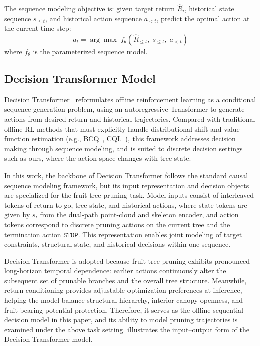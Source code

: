 \documentclass[12pt,a4paper,fontset=fandol]{ctexart}
\begin{document}
The sequence modeling objective is:
given target return $\hat{R}_t$, historical state sequence $s_{\leq t}$, and historical action sequence $a_{<t}$,
predict the optimal action at the current time step:
\begin{equation}\label{eq:seq_model}
  \hat{a}_t = \arg\max\; f_\theta\!\left(\hat{R}_{\leq t},\; s_{\leq t},\; a_{<t}\right)
\end{equation}
where $f_\theta$ is the parameterized sequence model.


\subsection{Decision Transformer Model}\label{sec:model:dt}

Decision Transformer~\citep{chen2021decision} reformulates offline reinforcement learning
as a conditional sequence generation problem,
using an autoregressive Transformer to generate actions from desired return and historical trajectories.
Compared with traditional offline RL methods that must explicitly handle distributional shift and value-function estimation (e.g.,
BCQ~\citep{fujimoto2019bcq}, CQL~\citep{kumar2020conservative}),
this framework addresses decision making through sequence modeling,
and is suited to discrete decision settings such as ours, where the action space changes with tree state.

In this work, the backbone of Decision Transformer follows the standard causal sequence modeling framework,
but its input representation and decision objects are specialized for the fruit-tree pruning task.
Model inputs consist of interleaved tokens of return-to-go, tree state, and historical actions,
where state tokens are given by $s_t$ from the dual-path point-cloud and skeleton encoder,
and action tokens correspond to discrete pruning actions on the current tree and the termination action $\texttt{STOP}$.
This representation enables joint modeling of target constraints, structural state, and historical decisions within one sequence.

Decision Transformer is adopted because fruit-tree pruning exhibits pronounced long-horizon temporal dependence:
earlier actions continuously alter the subsequent set of prunable branches and the overall tree structure.
Meanwhile, return conditioning provides adjustable optimization preferences at inference,
helping the model balance structural hierarchy, interior canopy openness, and fruit-bearing potential protection.
Therefore, it serves as the offline sequential decision model in this paper,
and its ability to model pruning trajectories is examined under the above task setting.
 illustrates the input--output form of the Decision Transformer model.
\end{document}
